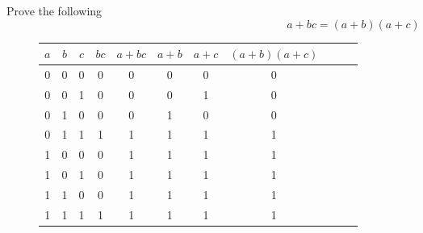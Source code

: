 \documentclass[11pt]{article}
\begin{document}
\begin{question}
	Prove the following
	\begin{equation}
		a+bc = (a+b)(a+c)
	\end{equation}

	\begin{figure}[h]
		\begin{center}
			\begin{tabular} { c c c | c c c c c c c c }
				$a$ & $b$ & $c$ & $bc$ & $a+bc$ & $a+b$ & $a+c$ & $(a+b)(a+c)$ \\
				\hline
				0 & 0 & 0 & 0 & 0 & 0 & 0 & 0 \\
				0 & 0 & 1 & 0 & 0 & 0 & 1 & 0 \\
				0 & 1 & 0 & 0 & 0 & 1 & 0 & 0 \\
				0 & 1 & 1 & 1 & 1 & 1 & 1 & 1 \\
				1 & 0 & 0 & 0 & 1 & 1 & 1 & 1 \\
				1 & 0 & 1 & 0 & 1 & 1 & 1 & 1 \\
				1 & 1 & 0 & 0 & 1 & 1 & 1 & 1 \\
				1 & 1 & 1 & 1 & 1 & 1 & 1 & 1 \\
			\end{tabular}
		\end{center}
	\end{figure}
\end{question}
\end{document}
